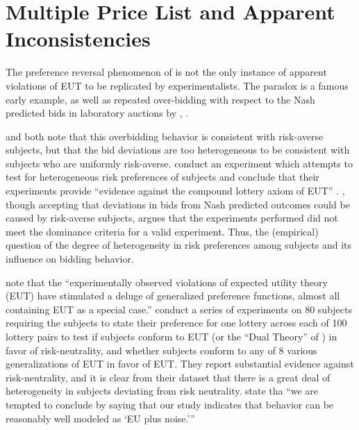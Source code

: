 \documentclass[11pt,a4paper]{report}
\begin{document}
\section{\texorpdfstring{\textcite{Holt2002}}{Holt \& Laury (2002)} Multiple Price List and Apparent Inconsistencies}

The preference reversal phenomenon of \textcite{Grether1979} is not the only instance of apparent violations of EUT to be replicated by experimentalists.
The \textcite{Ellsberg1961} paradox is a famous early example, as well as repeated over-bidding with respect to the Nash predicted bids in laboratory auctions by \textcite{Cox1982}, \textcite{Cox1983, Cox1983a, Cox1988}.


\textcite[160]{Cox1985} and \textcite[749]{Harrison1989} both note that this overbidding behavior is consistent with risk-averse subjects, but that the bid deviations are too heterogeneous to be consistent with subjects who are uniformly risk-averse.
\textcite{Cox1985} conduct an experiment which attempts to test for heterogeneous risk preferences of subjects and conclude that their experiments provide \enquote{evidence against the compound lottery axiom of EUT} \parencite[165]{Cox1985}.
\textcite{Harrison1989}, though accepting that deviations in bids from Nash predicted outcomes could be caused by risk-averse subjects, argues that the experiments performed did not meet the dominance criteria for a valid experiment.
Thus, the (empirical) question of the degree of heterogeneity in risk preferences among subjects and its influence on bidding behavior.


\textcite[1291]{Hey1994} note that the \enquote{experimentally observed violations of expected utility theory (EUT) have stimulated a deluge of generalized preference functions, almost all containing  EUT as a special case.}
\textcite{Hey1994} conduct a series of experiments on 80 subjects requiring the subjects to state their preference for one lottery across each of 100 lottery pairs to test if subjects conform to EUT (or the \enquote{Dual Theory} of \textcite{Yaari1987}) in favor of risk-neutrality, and whether subjects conform to any of 8 various generalizations of EUT in favor of EUT.
They report substantial evidence against risk-neutrality, and it is clear from their dataset that there is a great deal of heterogeneity in subjects deviating from risk neutrality.
\textcite[1322]{Hey1994} state tha \enquote{we are tempted to conclude by saying that our study indicates that behavior can be reasonably well modeled \textelp{} as \enquote{EU plus noise.}} 
\end{document}
